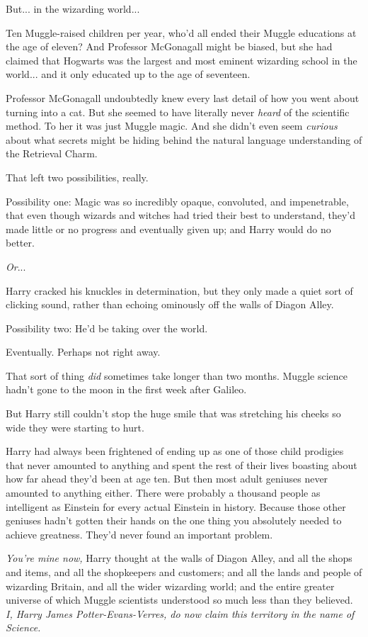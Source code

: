 But... in the wizarding world...

Ten Muggle-raised children per year, who'd all ended their Muggle
educations at the age of eleven? And Professor McGonagall might be
biased, but she had claimed that Hogwarts was the largest and most
eminent wizarding school in the world... and it only educated up to
the age of seventeen.

Professor McGonagall undoubtedly knew every last detail of how you went
about turning into a cat. But she seemed to have literally never
\emph{heard} of the scientific method. To her it was just Muggle magic.
And she didn't even seem \emph{curious} about what secrets might be
hiding behind the natural language understanding of the Retrieval Charm.

That left two possibilities, really.

Possibility one: Magic was so incredibly opaque, convoluted, and
impenetrable, that even though wizards and witches had tried their best
to understand, they'd made little or no progress and eventually given
up; and Harry would do no better.

\emph{Or}...

Harry cracked his knuckles in determination, but they only made a quiet
sort of clicking sound, rather than echoing ominously off the walls of
Diagon Alley.

Possibility two: He'd be taking over the world.

Eventually. Perhaps not right away.

That sort of thing \emph{did} sometimes take longer than two months.
Muggle science hadn't gone to the moon in the first week after Galileo.

But Harry still couldn't stop the huge smile that was stretching his
cheeks so wide they were starting to hurt.

Harry had always been frightened of ending up as one of those child
prodigies that never amounted to anything and spent the rest of their
lives boasting about how far ahead they'd been at age ten. But then most
adult geniuses never amounted to anything either. There were probably a
thousand people as intelligent as Einstein for every actual Einstein in
history. Because those other geniuses hadn't gotten their hands on the
one thing you absolutely needed to achieve greatness. They'd never found
an important problem.

\emph{You're mine now,} Harry thought at the walls of Diagon Alley, and
all the shops and items, and all the shopkeepers and customers; and all
the lands and people of wizarding Britain, and all the wider wizarding
world; and the entire greater universe of which Muggle scientists
understood so much less than they believed. \emph{I, Harry James
Potter-Evans-Verres, do now claim this territory in the name of
Science.}

